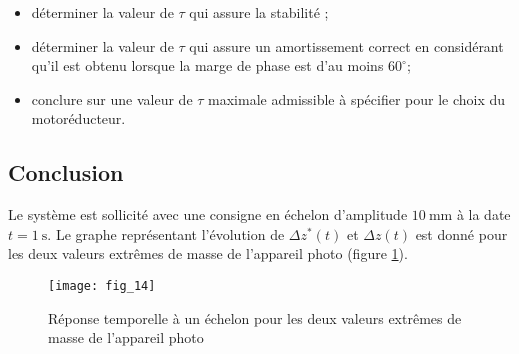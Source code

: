 \ifprof
\begin{corrige}
\end{corrige}
\else
\fi

\begin{itemize}
  \item déterminer la valeur de $\tau$ qui assure la stabilité ;
  \item déterminer la valeur de $\tau$ qui assure un amortissement correct en considérant qu'il est obtenu lorsque la marge de phase est d'au moins $60^{\circ}$;
\item conclure sur une valeur de $\tau$ maximale admissible à spécifier pour le choix du motoréducteur.
\end{itemize}
\ifprof
\begin{corrige}
\end{corrige}
\else
\fi


\subsection{Conclusion}
Le système est sollicité avec une consigne en échelon d'amplitude $10 \mathrm{~mm}$ à la date $t=1 \mathrm{~s}$. Le graphe représentant l'évolution de $\Delta z^{*}(t)$ et $\Delta z(t)$ est donné pour les deux valeurs extrêmes de masse de l'appareil photo (figure \ref{fig:14}).

\begin{figure}[H]
\centering
\texttt{[image: fig\_14]}
\caption{\label{fig:14}  Réponse temporelle à un échelon pour les deux valeurs extrêmes de masse de l'appareil photo}
\end{figure}

\ifprof
\begin{corrige}
\end{corrige}
\else
\fi

